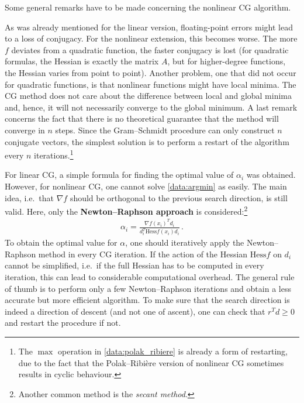     Some general remarks have to be made concerning the nonlinear CG algorithm.
    \begin{remark}
        As was already mentioned for the linear version, floating-point errors might lead to a loss of conjugacy. For the nonlinear extension, this becomes worse. The more $f$ deviates from a quadratic function, the faster conjugacy is lost (for quadratic formulas, the Hessian is exactly the matrix $A$, but for higher-degree functions, the Hessian varies from point to point). Another problem, one that did not occur for quadratic functions, is that nonlinear functions might have local minima. The CG method does not care about the difference between local and global minima and, hence, it will not necessarily converge to the global minimum. A last remark concerns the fact that there is no theoretical guarantee that the method will converge in $n$ steps. Since the Gram--Schmidt procedure can only construct $n$ conjugate vectors, the simplest solution is to perform a restart of the algorithm every $n$ iterations.\footnote{The $\max$ operation in \cref{data:polak_ribiere} is already a form of restarting, due to the fact that the Polak--Ribi\`ere version of nonlinear CG sometimes results in cyclic behaviour.}
    \end{remark}

    For linear CG, a simple formula for finding the optimal value of $\alpha_i$ was obtained. However, for nonlinear CG, one cannot solve \cref{data:argmin} as easily. The main idea, i.e.~that $\nabla f$ should be orthogonal to the previous search direction, is still valid. Here, only the \textbf{Newton--Raphson approach} is considered:\footnote{Another common method is the \textit{secant method}.}
    \begin{gather}
        \alpha_i = \frac{\nabla f(x_i)^Td_i}{d_i^T\mathrm{Hess}f(x_i)d_i}\,.
    \end{gather}
    To obtain the optimal value for $\alpha$, one should iteratively apply the Newton--Raphson method in every CG iteration. If the action of the Hessian $\mathrm{Hess}f$ on $d_i$ cannot be simplified, i.e.~if the full Hessian has to be computed in every iteration, this can lead to considerable computational overhead. The general rule of thumb is to perform only a few Newton--Raphson iterations and obtain a less accurate but more efficient algorithm. To make sure that the search direction is indeed a direction of descent (and not one of ascent), one can check that $r^Td\geq0$ and restart the procedure if not.

